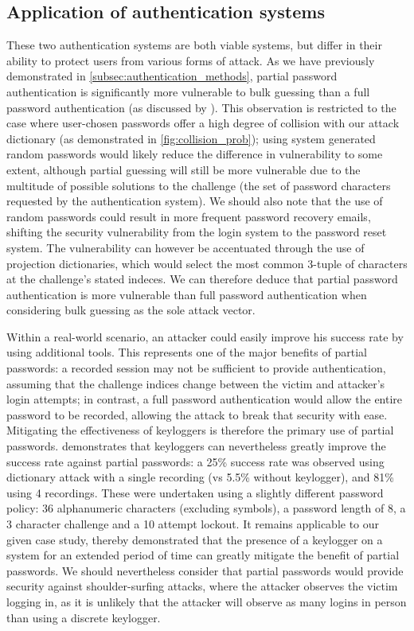 \documentclass[british,11pt,a4paper]{article}
\begin{document}
\subsection{Application of authentication systems}
These two authentication systems are both viable systems, but differ in their ability to protect users from various forms of attack. As we have previously demonstrated in \autoref{subsec:authentication_methods}, partial password authentication is significantly more vulnerable to bulk guessing than a full password authentication (as discussed by \citet{Aspinall2013-sh}). This observation is restricted to the case where user-chosen passwords offer a high degree of collision with our attack dictionary (as demonstrated in \autoref{fig:collision_prob}); using system generated random passwords would likely reduce the difference in vulnerability to some extent, although partial guessing will still be more vulnerable due to the multitude of possible solutions to the challenge (the set of password characters requested by the authentication system). We should also note that the use of random passwords could result in more frequent password recovery emails, shifting the security vulnerability from the login system to the password reset system. The vulnerability can however be accentuated through the use of projection dictionaries, which would select the most common 3-tuple of characters at the challenge's stated indeces. We can therefore deduce that partial password authentication is more vulnerable than full password authentication when considering bulk guessing as the sole attack vector.

Within a real-world scenario, an attacker could easily improve his success rate by using additional tools. This represents one of the major benefits of partial passwords: a recorded session may not be sufficient to provide authentication, assuming that the challenge indices change between the victim and attacker's login attempts; in contrast, a full password authentication would allow the entire password to be recorded, allowing the attack to break that security with ease. Mitigating the effectiveness of keyloggers is therefore the primary use of partial passwords. \citet{Aspinall2013-sh} demonstrates that keyloggers can nevertheless greatly improve the success rate against partial passwords: a 25\% success rate was observed using dictionary attack with a single recording (vs 5.5\% without keylogger), and 81\% using 4 recordings. These were undertaken using a slightly different password policy: 36 alphanumeric characters (excluding symbols), a password length of 8, a 3 character challenge and a 10 attempt lockout. It remains applicable to our given case study, thereby demonstrated that the presence of a keylogger on a system for an extended period of time can greatly mitigate the benefit of partial passwords. We should nevertheless consider that partial passwords would provide security against shoulder-surfing attacks, where the attacker observes the victim logging in, as it is unlikely that the attacker will observe as many logins in person than using a discrete keylogger. 
\end{document}
